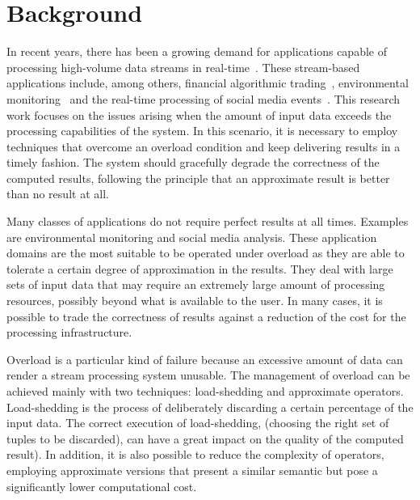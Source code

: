 \chapter{Background}
\label{ch:background}

In recent years, there has been a growing demand for applications capable of processing high-volume data
streams in real-time~\cite{8-reqs}. These stream-based applications include, among others, financial
algorithmic trading~\cite{streambase-algo}, environmental monitoring~\cite{swissexp} and the real-time
processing of social media events~\cite{social-networks}.  
This research work focuses on the issues arising when the amount of input data
exceeds the processing capabilities of the system. In this scenario, it is necessary to employ
techniques that overcome an overload condition and keep delivering results in a timely fashion. 
The system should gracefully degrade the correctness
of the computed results, following the principle that an approximate result is better than no
result at all. 

Many classes of applications do not require perfect results at all times. Examples are
environmental monitoring and social media analysis. These application domains are the most suitable to be operated
under overload as they are able to tolerate a certain degree of approximation in the results. They deal
with large sets of input data that may require an extremely large amount of processing resources,
possibly beyond what is available to the user. In many cases, it is possible to trade the correctness of
results against a reduction of the cost for the processing infrastructure.

Overload is a particular kind of failure because an excessive amount of data can render a
stream processing system unusable. The management of overload can be achieved mainly with two
techniques: \mbox{load-shedding} and approximate operators. \mbox{Load-shedding} is the process of
deliberately discarding a certain percentage of the input data. The correct execution of load-shedding,
(\ie choosing the right set of tuples to be discarded), can have a great impact on the quality of the computed result).
In addition, it is also possible to reduce the complexity of operators, employing approximate versions
that present a similar semantic but pose a significantly lower computational cost.



